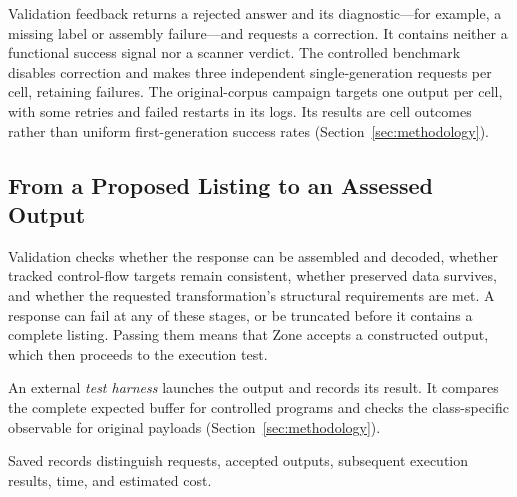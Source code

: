 Validation feedback returns a rejected answer and its diagnostic---for
example, a missing label or assembly failure---and requests a correction.
It contains neither a functional success signal nor a scanner verdict.
The controlled benchmark disables correction and makes three independent
single-generation requests per cell, retaining failures. The original-corpus
campaign targets one output per cell, with some retries and failed
restarts in its logs. Its results are cell outcomes rather than uniform
first-generation success rates (Section~\ref{sec:methodology}).

\subsection{From a Proposed Listing to an Assessed Output}
Validation checks whether the response can be assembled and decoded,
whether tracked control-flow targets remain consistent, whether preserved
data survives, and whether the requested transformation's structural
requirements are met. A response can fail at any of these stages, or be
truncated before it contains a complete listing. Passing them means that
Zone accepts a constructed output, which then proceeds to the execution test.

An external \emph{test harness} launches the output and records its result.
It compares the complete expected buffer for controlled programs and
checks the class-specific observable for original payloads
(Section~\ref{sec:methodology}).


Saved records distinguish requests, accepted outputs, subsequent execution
results, time, and estimated cost.
